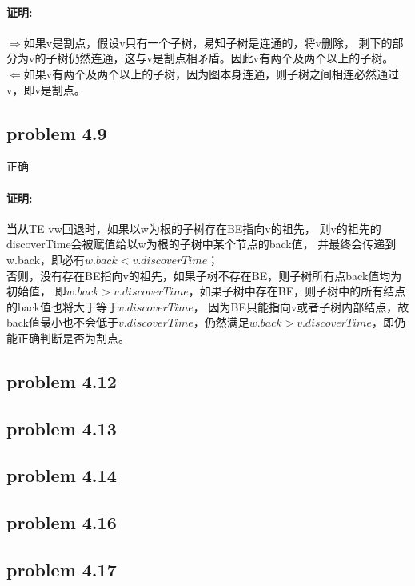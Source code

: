 \documentclass[11pt,a4paper,oneside,oldfontcommands]{ctexart}
\begin{document}
\paragraph{证明:}
\textbf{$\Rightarrow$}如果v是割点，假设v只有一个子树，易知子树是连通的，将v删除，
剩下的部分为v的子树仍然连通，这与v是割点相矛盾。因此v有两个及两个以上的子树。\\
\textbf{$\Leftarrow$}如果v有两个及两个以上的子树，因为图本身连通，则子树之间相连必然通过v，即v是割点。
{\subsection*{problem 4.9}}
正确
\paragraph{证明:}
当从TE vw回退时，如果以w为根的子树存在BE指向v的祖先，
则v的祖先的discoverTime会被赋值给以w为根的子树中某个节点的back值，
并最终会传递到w.back，即必有$w.back<v.discoverTime$；\\
\hspace*{20pt}否则，没有存在BE指向v的祖先，如果子树不存在BE，则子树所有点back值均为初始值，
即$w.back>v.discoverTime$，如果子树中存在BE，则子树中的所有结点的back值也将大于等于$v.discoverTime$，
因为BE只能指向v或者子树内部结点，故back值最小也不会低于$v.discoverTime$，仍然满足$w.back>v.discoverTime$，即仍能正确判断是否为割点。
{\subsection*{problem 4.12}}
{\subsection*{problem 4.13}}
{\subsection*{problem 4.14}}
{\subsection*{problem 4.16}}
{\subsection*{problem 4.17}}
\end{document}
